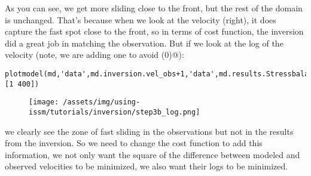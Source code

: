 As you can see, we get more sliding close to the front, but the rest of the domain is unchanged. That's because when we look at the velocity (right), it does capture the fast spot close to the front, so in terms of cost function, the inversion did a great job in matching the observation. But if we look at the log of the velocity (note, we are adding one to avoid \verb@log(0)@):
\begin{verbatim}plotmodel(md,'data',md.inversion.vel_obs+1,'data',md.results.StressbalanceSolution.Vel+1,'log#all',10,'caxis#all',[1 400])
\end{verbatim}
\begin{figure}[H]
	\begin{center}
		\texttt{[image: /assets/img/using-issm/tutorials/inversion/step3b\_log.png]}
	\end{center}
\end{figure}
we clearly see the zone of fast sliding in the observations but not in the results from the inversion. So we need to change the cost function to add this information, we not only want the square of the difference between modeled and observed velocities to be minimized, we also want their logs to be minimized.

